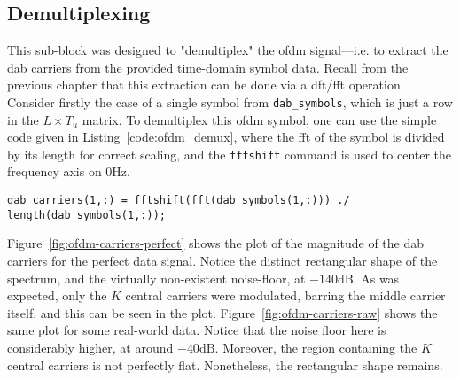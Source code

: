 \documentclass[class=report,11pt,crop=false]{standalone}
\begin{document}
\subsection{ Demultiplexing \label{subsect:dab-proc_ofdm-demux}}

This sub-block was designed to "demultiplex" the \gls{ofdm} signal---i.e. to extract the \gls{dab} carriers from the provided time-domain symbol data. Recall from the previous chapter that this extraction can be done via a \gls{dft}/\gls{fft} operation. Consider firstly the case of a single symbol from \texttt{dab\_symbols}, which is just a row in the \(L \times T_u\) matrix. To demultiplex this \gls{ofdm} symbol, one can use the simple code given in Listing~\ref{code:ofdm_demux}, where the \gls{fft} of the symbol is divided by its length for correct scaling, and the \texttt{fftshift} command is used to center the frequency axis on \(0\si{\hertz}\).

\begin{lstlisting}[caption={\textsc{Matlab} code for demultiplexing an \gls{ofdm} symbol}, label={code:ofdm_demux}]
dab_carriers(1,:) = fftshift(fft(dab_symbols(1,:))) ./ length(dab_symbols(1,:));
\end{lstlisting}

Figure~\ref{fig:ofdm-carriers-perfect} shows the plot of the magnitude of the \gls{dab} carriers for the perfect data signal. Notice the distinct rectangular shape of the spectrum, and the virtually non-existent noise-floor, at \(-140\si{\deci\bel}\). As was expected, only the \(K\) central carriers were modulated, barring the middle carrier itself, and this can be seen in the plot. Figure~\ref{fig:ofdm-carriers-raw} shows the same plot for some real-world data. Notice that the noise floor here is considerably higher, at around \(-40\si{\deci\bel}\). Moreover, the region containing the \(K\) central carriers is not perfectly flat. Nonetheless, the rectangular shape remains.
\end{document}
